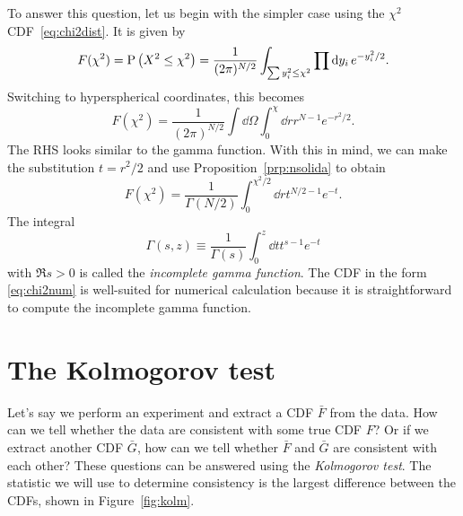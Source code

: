 To answer this question, let us begin with the simpler case using
the $\chi^2$ CDF~\eqref{eq:chi2dist}. It is given by
\begin{equation}
  F(\chi^2)=\operatorname{P}\left(X^2\le\chi^2\right)
           =\frac{1}{(2\pi)^{N/2}}\int_{\sum y_i^2\le\chi^2}
            \prod\dd{y_i}e^{-y_i^2/2}.
\end{equation}
Switching to hyperspherical coordinates, this becomes
\begin{equation}
  F(\chi^2)=\frac{1}{(2\pi)^{N/2}}
              \int\dd{\Omega}\int_0^\chi\dd{r}r^{N-1}e^{-r^2/2}.
\end{equation}
The RHS looks similar to the gamma function. With this in mind,
we can make the substitution $t=r^2/2$ and use Proposition~\ref{prp:nsolida}
to obtain
\begin{equation}\label{eq:chi2num}
  F(\chi^2)=\frac{1}{\Gamma(N/2)}\int_0^{\chi^2/2}\dd{r}t^{N/2-1}e^{-t}.
\end{equation}
  The integral
  \begin{equation}
    \Gamma(s,z)\equiv\frac{1}{\Gamma(s)}\int_0^z\dd{t}t^{s-1}e^{-t}
  \end{equation}
  with $\Re s>0$ is called the {\it incomplete gamma function}.
The CDF in the form \eqref{eq:chi2num} is well-suited for numerical
calculation because it is straightforward to compute the incomplete
gamma function.


\section{The Kolmogorov test}
Let's say we perform an experiment and extract a CDF $\bar{F}$ from 
the data. How can we tell whether the data are consistent with some
true CDF $F$? Or if we extract another CDF $\bar{G}$, how can
we tell whether $\bar{F}$ and $\bar{G}$ are consistent with each other?
These questions can be answered using the {\it Kolmogorov test}.
The statistic we will use to determine consistency is the
largest difference between the CDFs, shown in
Figure~\ref{fig:kolm}.

